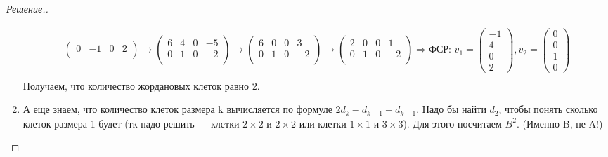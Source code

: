 \documentclass[a4paper]{article}
\theoremstyle{remark}
\begin{document}
\begin{proof}[Решение.]
\begin{enumerate}
\begin{multline*}
\begin{pmatrix}
                        0 & -1 & 0 & 2 \\
                    \end{pmatrix} \to 
                    \begin{pmatrix}
                        6 & 4 & 0 & -5 \\
                        0 & 1 & 0 & -2 \\
                    \end{pmatrix}
                    \to 
                    \begin{pmatrix}
                        6 & 0 & 0 & 3 \\
                        0 & 1 & 0 & -2 \\
                    \end{pmatrix}
                    \to 
                    \begin{pmatrix}
                        2 & 0 & 0 & 1 \\
                        0 & 1 & 0 & -2 \\
                    \end{pmatrix} 
                     \Rightarrow
                    \text{ФСР: }
                    v_1 = \begin{pmatrix}
                        -1\\
                        4\\
                        0\\
                        2
                    \end{pmatrix}, v_2 = 
                    \begin{pmatrix}
                        0\\
                        0\\
                        1\\
                        0
                    \end{pmatrix}\\
                \end{multline*}
                Получаем, что количество жордановых клеток равно 2.
                \item А еще знаем, что количество клеток размера k вычисляется по формуле 
                $2d_k - d_{k- 1} - d_{k + 1}$. Надо бы найти $d_2$, 
                чтобы понять сколько клеток размера 1 будет (тк надо решить --- клетки $2 \times 2$ и $2 \times 2$ или клетки 
                $1 \times 1$ и $3 \times 3$).
                Для этого посчитаем $B^2$. (Именно B, не A!)

\end{enumerate}
\end{proof}
\end{document}
